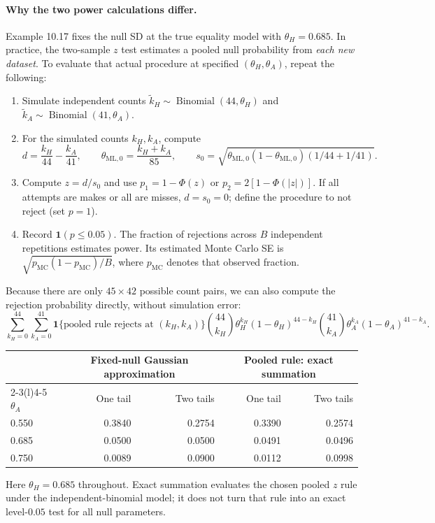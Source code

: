 \documentclass[11pt]{article}
\newcommand{\rv}[1]{\widetilde{#1}}
\begin{document}
\paragraph{Why the two power calculations differ.}
Example 10.17 fixes the null SD at the true equality model with
$\theta_H=0.685$. In practice, the two-sample $z$ test estimates a pooled
null probability from \emph{each new dataset}. To evaluate that actual
procedure at specified $(\theta_H,\theta_A)$, repeat the following:
\begin{enumerate}[label=\arabic*.]
 \item Simulate independent counts
 $\rv k_H\sim\operatorname{Binomial}(44,\theta_H)$ and
 $\rv k_A\sim\operatorname{Binomial}(41,\theta_A)$.
 \item For the simulated counts $k_H,k_A$, compute
 \[
 d=\frac{k_H}{44}-\frac{k_A}{41},\qquad
 \theta_{\mathrm{ML},0}=\frac{k_H+k_A}{85},\qquad
 s_0=\sqrt{\theta_{\mathrm{ML},0}(1-\theta_{\mathrm{ML},0})
                  (1/44+1/41)}.
 \]
 \item Compute $z=d/s_0$ and use
 $p_1=1-\Phi(z)$ or $p_2=2[1-\Phi(|z|)]$.
 If all attempts are makes or all are misses, $d=s_0=0$;
 define the procedure to not reject (set $p=1$).
 \item Record $\mathbf 1(p\leq0.05)$.
 The fraction of rejections across $B$ independent repetitions estimates
 power. Its estimated Monte Carlo SE is
 $\sqrt{p_{\mathrm{MC}}(1-p_{\mathrm{MC}})/B}$,
 where $p_{\mathrm{MC}}$ denotes that observed fraction.
\end{enumerate}
Because there are only $45\times42$ possible count pairs, we can also
compute the rejection probability directly, without simulation error:
\[
 \sum_{k_H=0}^{44}\sum_{k_A=0}^{41}
 \mathbf 1\{\text{pooled rule rejects at }(k_H,k_A)\}
 \binom{44}{k_H}\theta_H^{k_H}(1-\theta_H)^{44-k_H}
 \binom{41}{k_A}\theta_A^{k_A}(1-\theta_A)^{41-k_A}.
\]
\begin{center}
\begin{tabular}{@{}lrrrr@{}}
\toprule
 &\multicolumn{2}{c}{Fixed-null Gaussian approximation}
 &\multicolumn{2}{c}{Pooled rule: exact summation}\\
\cmidrule(lr){2-3}\cmidrule(l){4-5}
$\theta_A$ & One tail & Two tails & One tail & Two tails\\\midrule
0.550 &0.3840&0.2754&0.3390&0.2574\\
0.685 &0.0500&0.0500&0.0491&0.0496\\
0.750 &0.0089&0.0900&0.0112&0.0998\\
\bottomrule
\end{tabular}
\end{center}
\noindent Here $\theta_H=0.685$ throughout. Exact summation evaluates the
chosen pooled $z$ rule under the independent-binomial model; it does not
turn that rule into an exact level-$0.05$ test for all null parameters.
\end{document}
